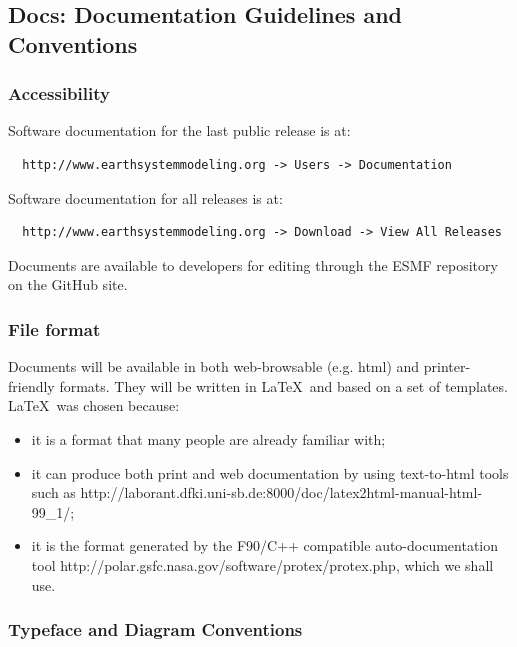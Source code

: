 \subsection{Docs: Documentation Guidelines and Conventions}
\label{sec:docguidelines}

\subsubsection{Accessibility}

Software documentation for the last public release is at:
\begin{verbatim}
  http://www.earthsystemmodeling.org -> Users -> Documentation
\end{verbatim} 

Software documentation for all releases is at:
\begin{verbatim}
  http://www.earthsystemmodeling.org -> Download -> View All Releases
\end{verbatim}

Documents are available to developers for editing through the
ESMF repository on the GitHub site.

\subsubsection{File format}

Documents will be available in both web-browsable (e.g. html) and
printer-friendly formats.  They will be written in \LaTeX\ and based on a
set of templates. \LaTeX\ was chosen because:

\begin{itemize}
\item it is a format that many people are already familiar with; 
\item it can produce both print and web documentation by using text-to-html
tools such as  
{http://laborant.dfki.uni-sb.de:8000/doc/latex2html-manual-html-99\_1/};
\item it is the format generated by the F90/C++ compatible 
auto-documentation tool 
{http://polar.gsfc.nasa.gov/software/protex/protex.php}\cite{protex}, 
which we shall use.
\end{itemize}

\subsubsection{Typeface and Diagram Conventions}

